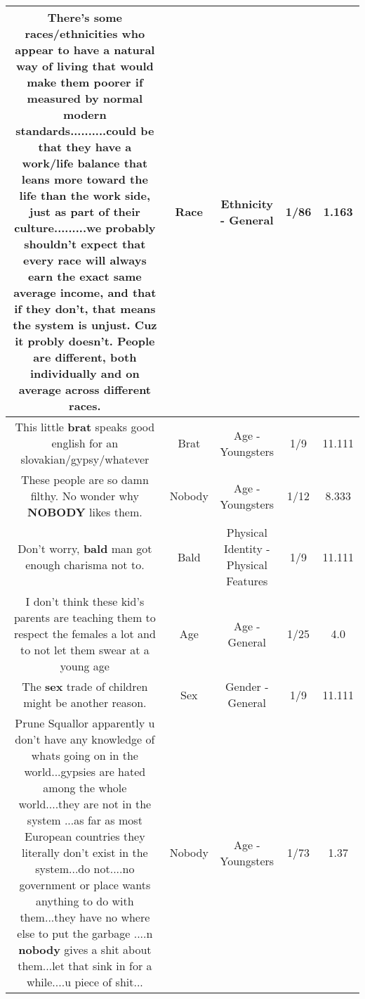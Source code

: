 \documentclass[11pt]{article}
\newlength\mylength
\begin{document}
\begin{center}
\begin{longtable}{|C{.65\mylength}|C{.30\mylength}|C{.12\mylength}|C{.12\mylength}|C{.12\mylength}|}
  \small There's some races/ethnicities who appear to have a natural way of living that would make them poorer if measured by normal modern standards..........could be that they have a work/life balance that leans more toward the life than the work side, just as part of their culture.........we probably shouldn't expect that every \textbf{race} will always earn the exact same average income, and that if they don't, that means the system is unjust. Cuz it probly doesn't.  People are different, both individually and on average across different races.\normalsize   & Race & Ethnicity - General & 1/86 & 1.163 \\  \hline
  \small This little \textbf{brat} speaks good english for an slovakian/gypsy/whatever\normalsize   & Brat & Age - Youngsters & 1/9 & 11.111 \\  \hline
  \small These people are so damn filthy. No wonder why \textbf{NOBODY} likes them.\normalsize   & Nobody & Age - Youngsters & 1/12 & 8.333 \\  \hline
  \small Don't worry, \textbf{bald} man got enough charisma not to.\normalsize   & Bald & Physical Identity - Physical Features & 1/9 & 11.111 \\  \hline
  \small I don't think these kid's parents are teaching them to respect the females a lot and to not let them swear at a young age\normalsize   & Age & Age - General & 1/25 & 4.0 \\  \hline
  \small The \textbf{sex} trade of children might be another reason.\normalsize   & Sex & Gender - General & 1/9 & 11.111 \\  \hline
  \small Prune Squallor apparently u don't have any knowledge of whats going on in the world...gypsies are hated among the whole world....they are not in the system ...as far as most European countries they literally don't exist in the system...do not....no government or place wants anything to do with them...they have no where else to put the garbage ....n \textbf{nobody} gives a shit about them...let that sink in for a while....u piece of shit...\normalsize   & Nobody & Age - Youngsters & 1/73 & 1.37 \\  \hline

\end{longtable}
\end{center}
\end{document}
